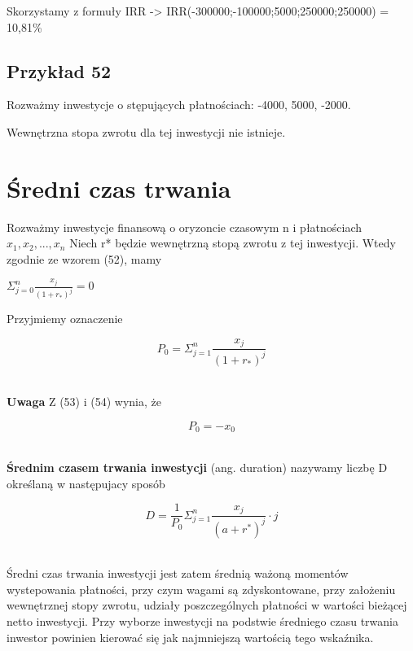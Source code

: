 \documentclass{article}
\begin{document}
Skorzystamy z formuły IRR -> IRR(-300000;-100000;5000;250000;250000) = 10,81\% \\

\subsection{Przykład 52}

Rozważmy inwestycje o stępujących płatnościach: -4000, 5000, -2000.

Wewnętrzna stopa zwrotu dla tej inwestycji nie istnieje.

\newpage

\section{Średni czas trwania}

Rozważmy inwestycje finansową o oryzoncie czasowym n i płatnościach $ x_1, x_2, ..., x_n $ Niech r* będzie wewnętrzną stopą zwrotu z tej inwestycji. Wtedy zgodnie ze wzorem (52), mamy

	$	\Sigma ^n_{j=0}\frac{x_j}{(1 + r_*)^j} = 0 $

Przyjmiemy oznaczenie

\begin{center}
	\begin{equation}
		P_0 = \Sigma ^n_{j=1}\frac{x_j}{(1 + r_*)^j}
	\end{equation}
\end{center}\\

\textbf{Uwaga} Z (53) i (54) wynia, że

\begin{center}
	\begin{equation}
		P_0 = -x_0
	\end{equation}
\end{center}\\

\textbf{Średnim czasem trwania inwestycji} (ang. duration) nazywamy liczbę D określaną w następujacy sposób

\begin{center}
	\begin{equation}
		D = \frac{1}{P_0}\Sigma ^n_{j=1} \frac{x_j}{(a + r^*)^j} \cdot j
	\end{equation}
\end{center}\\

Średni czas trwania inwestycji jest zatem średnią ważoną momentów wystepowania płatności, przy czym wagami są zdyskontowane, przy założeniu wewnętrznej stopy zwrotu, udziały poszczególnych płatności w wartości bieżącej netto inwestycji. Przy wyborze inwestycji na podstwie średniego czasu trwania inwestor powinien kierować się jak najmniejszą wartością tego wskaźnika. \\
\end{document}
